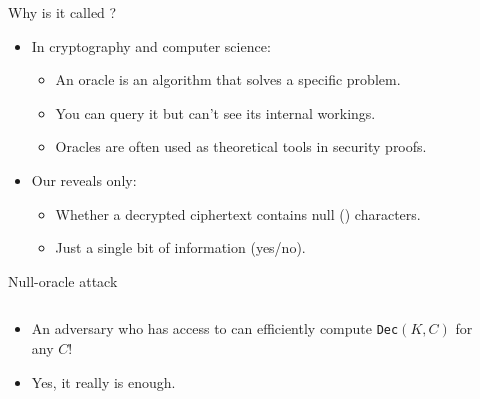 \documentclass[aspectratio=169, lualatex, handout]{beamer}
\begin{document}
\begin{frame}{Why is it called ?}
	\begin{itemize}[<+->]
		\item In cryptography and computer science:
		      \begin{itemize}
			      \item An oracle is an algorithm that solves a specific problem.
			      \item You can query it but can't see its internal workings.
			      \item Oracles are often used as theoretical tools in security proofs.
		      \end{itemize}
		\item Our  reveals only:
		      \begin{itemize}
			      \item Whether a decrypted ciphertext contains null (\bit{0}) characters.
			      \item Just a single bit of information (yes/no).
		      \end{itemize}
	\end{itemize}
\end{frame}

\begin{frame}{Null-oracle attack}
	\begin{columns}[c]
		\begin{column}{0.6\textwidth}
			\begin{itemize}[<+->]
				\item An adversary who has access to  can efficiently compute \texttt{Dec}$(K, C)$ for any $C$!
				\item Yes, it really is enough.
			\end{itemize}
		\end{column}
		\begin{column}{0.4\textwidth}
		\end{column}
	\end{columns}
\end{frame}
\end{document}

